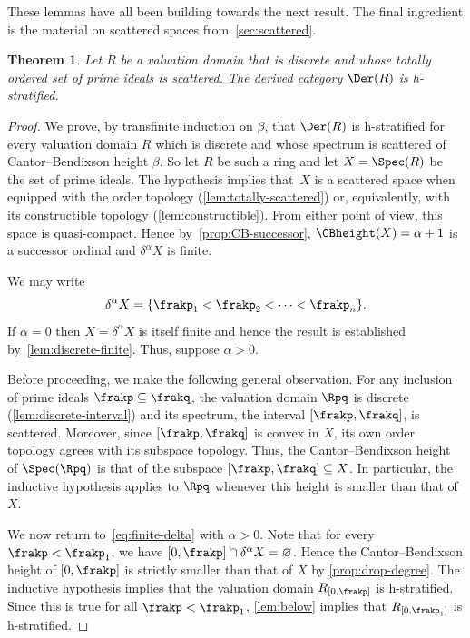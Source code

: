 \documentclass{amsart}
\numberwithin{equation}{section}%
\newtheorem{Thm}[equation]{Theorem}
\theoremstyle{remark}
\renewcommand{\emptyset}{\varnothing}
\begin{document}
These lemmas have all been building towards the next result. The final ingredient is the material on scattered spaces from~\cref{sec:scattered}.

\begin{Thm}\label{thm:one-direction}
	Let $R$ be a valuation domain that is discrete and whose totally ordered set of prime ideals is scattered. The derived category $\Der(R)$ is h-stratified.
\end{Thm}

\begin{proof}
	We prove, by transfinite induction on $\beta$, that $\Der(R)$ is h-stratified for every valuation domain $R$ which is discrete and whose spectrum is scattered of Cantor--Bendixson height $\beta$. So let $R$ be such a ring and let $X = \Spec(R)$ be the set of prime ideals. The hypothesis implies that~$X$ is a scattered space when equipped with the order topology (\cref{lem:totally-scattered}) or, equivalently, with its constructible topology (\cref{lem:constructible}). From either point of view, this space is quasi-compact. Hence by~\cref{prop:CB-successor}, $\CBheight(X) = \alpha + 1$ is a successor ordinal and $\delta^\alpha X$ is finite.
  
	We may write 
	\begin{equation}\label{eq:finite-delta}
		\delta^\alpha X = \{ \frakp_1 < \frakp_2 < \cdots < \frakp_n \}.
	\end{equation}
	If $\alpha = 0$ then $X=\delta^\alpha X$ is itself finite and hence the result is established by~\cref{lem:discrete-finite}. Thus, suppose $\alpha > 0$. 


	Before proceeding, we make the following general observation. For any inclusion of prime ideals $\frakp \subseteq \frakq$, the valuation domain $\Rpq$ is discrete (\cref{lem:discrete-interval}) and its spectrum, the interval $[\frakp,\frakq]$, is scattered. Moreover, since $[\frakp,\frakq]$ is convex in $X$, its own order topology agrees with its subspace topology. Thus, the Cantor--Bendixson height of $\Spec(\Rpq)$ is that of the subspace $[\frakp,\frakq] \subseteq X$. In particular, the inductive hypothesis applies to $\Rpq$ whenever this height is smaller than that of $X$.

	We now return to~\eqref{eq:finite-delta} with $\alpha > 0$. Note that for every $\frakp < \frakp_1$, we have $[0,\frakp]\cap \delta^\alpha X = \emptyset$. Hence the Cantor--Bendixson height of $[0,\frakp]$ is strictly smaller than that of $X$ by \cref{prop:drop-degree}. The inductive hypothesis implies that the valuation domain $R_{[0,\frakp]}$ is h-stratified. Since this is true for all $\frakp < \frakp_1$, \cref{lem:below} implies that $R_{[0,\frakp_1]}$ is h-stratified.


\end{proof}
\end{document}
